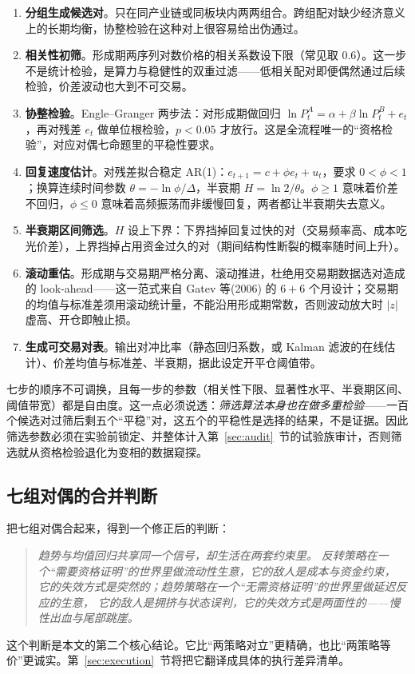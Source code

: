 \begin{enumerate}[leftmargin=2.2em]
  \item \textbf{分组生成候选对}。只在同产业链或同板块内两两组合。跨组配对缺少经济意义上的长期均衡，协整检验在这种对上很容易给出伪通过。
  \item \textbf{相关性初筛}。形成期两序列对数价格的相关系数设下限（常见取 $0.6$）。这一步不是统计检验，是算力与稳健性的双重过滤——低相关配对即便偶然通过后续检验，价差波动也大到不可交易。
  \item \textbf{协整检验}。Engle--Granger 两步法\cite{englegranger1987}：对形成期做回归 $\ln P^A_t=\alpha+\beta\ln P^B_t+e_t$，再对残差 $e_t$ 做单位根检验\cite{dickeyfuller1979}，$p<0.05$ 才放行。这是全流程唯一的“资格检验”，对应对偶七命题里的平稳性要求。
  \item \textbf{回复速度估计}。对残差拟合稳定 AR(1)：$e_{t+1}=c+\phi e_t+u_t$，要求 $0<\phi<1$；换算连续时间参数 $\theta=-\ln\phi/\Delta$，半衰期 $H=\ln 2/\theta$。$\phi\ge1$ 意味着价差不回归，$\phi\le0$ 意味着高频振荡而非缓慢回复，两者都让半衰期失去意义。
  \item \textbf{半衰期区间筛选}。$H$ 设上下界：下界挡掉回复过快的对（交易频率高、成本吃光价差），上界挡掉占用资金过久的对（期间结构性断裂的概率随时间上升）。
  \item \textbf{滚动重估}。形成期与交易期严格分离、滚动推进，杜绝用交易期数据选对造成的 look-ahead——这一范式来自 Gatev 等(2006) 的 $6+6$ 个月设计\cite{gatev2006}；交易期的均值与标准差须用滚动统计量，不能沿用形成期常数，否则波动放大时 $|z|$ 虚高、开仓即触止损。
  \item \textbf{生成可交易对表}。输出对冲比率（静态回归系数，或 Kalman 滤波的在线估计\cite{elliott2005}）、价差均值与标准差、半衰期，据此设定开平仓阈值带。
\end{enumerate}

七步的顺序不可调换，且每一步的参数（相关性下限、显著性水平、半衰期区间、阈值带宽）都是自由度。这一点必须说透：\emph{筛选算法本身也在做多重检验}——一百个候选对过筛后剩五个“平稳”对，这五个的平稳性是选择的结果，不是证据。因此筛选参数必须在实验前锁定、并整体计入第~\ref{sec:audit}~节的试验族审计，否则筛选就从资格检验退化为变相的数据窥探。

\subsection{七组对偶的合并判断}

把七组对偶合起来，得到一个修正后的判断：

\begin{quote}
\itshape
趋势与均值回归共享同一个信号，却生活在两套约束里。
反转策略在一个“需要资格证明”的世界里做流动性生意，它的敌人是成本与资金约束，
它的失效方式是突然的；趋势策略在一个“无需资格证明”的世界里做延迟反应的生意，
它的敌人是拥挤与状态误判，它的失效方式是两面性的——慢性出血与尾部跳崖。
\end{quote}

这个判断是本文的第二个核心结论。它比“两策略对立”更精确，也比“两策略等价”更诚实。第~\ref{sec:execution}~节将把它翻译成具体的执行差异清单。
